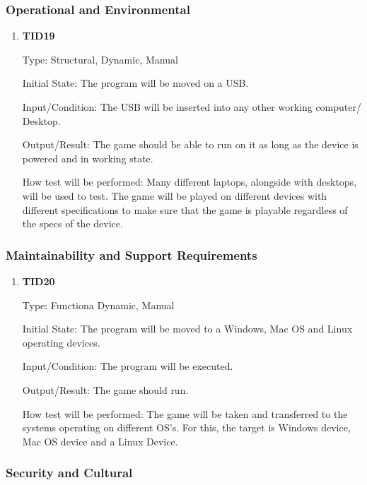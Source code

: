 \documentclass[12pt, titlepage]{article}
\begin{document}
\subsubsection{Operational and Environmental}

\begin{enumerate}
	
	\item{\textbf{TID19}\\}
	
	Type: Structural, Dynamic, Manual
	
	Initial State: The program will be moved on a USB.
	
	Input/Condition: The USB will be inserted into any other working computer/ Desktop.
	
	Output/Result: The game should be able to run on it as long as the device is powered and in working state.
	
	How test will be performed: Many different laptops, alongside with desktops, will be used to test. The game will be played on different devices with different specifications to make sure that the game is playable regardless of the specs of the device.
	
	
\end{enumerate}

\subsubsection{Maintainability and Support Requirements}

\begin{enumerate}
	
	\item{\textbf{TID20}\\}
	
	Type: Functiona Dynamic, Manual
	
	Initial State: The program will be moved to a Windows, Mac OS and Linux operating devices.
	
	Input/Condition: The program will be executed.
	
	Output/Result: The game should run.
	
	How test will be performed: The game will be taken and transferred to the systems operating on different OS's. For this, the target is Windows device, Mac OS device and a Linux Device. 
	
	
\end{enumerate}

\subsubsection{Security and Cultural}
\end{document}
